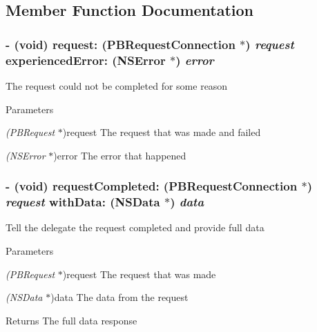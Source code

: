 \subsection{Member Function Documentation}
\hypertarget{protocol_p_b_request_data_delegate-p_ac1ed08e62e6d22f177e90a8ffa2529e7}{
\subsubsection[{request:experiencedError:}]{\setlength{\rightskip}{0pt plus 5cm}-\/ (void) request: ({\bf PBRequestConnection} $\ast$) {\em request}\/ experiencedError: (NSError $\ast$) {\em error}}}
\label{protocol_p_b_request_data_delegate-p_ac1ed08e62e6d22f177e90a8ffa2529e7}
The request could not be completed for some reason 
\begin{DoxyParams}{Parameters}
\item[{\em (PBRequest}]$\ast$)request The request that was made and failed \item[{\em (NSError}]$\ast$)error The error that happened \end{DoxyParams}
\hypertarget{protocol_p_b_request_data_delegate-p_a8c470348d27d13f5d8784b65c8989e95}{
\subsubsection[{requestCompleted:withData:}]{\setlength{\rightskip}{0pt plus 5cm}-\/ (void) requestCompleted: ({\bf PBRequestConnection} $\ast$) {\em request}\/ withData: (NSData $\ast$) {\em data}}}
\label{protocol_p_b_request_data_delegate-p_a8c470348d27d13f5d8784b65c8989e95}
Tell the delegate the request completed and provide full data 
\begin{DoxyParams}{Parameters}
\item[{\em (PBRequest}]$\ast$)request The request that was made \item[{\em (NSData}]$\ast$)data The data from the request \end{DoxyParams}
\begin{DoxyReturn}{Returns}
The full data response 
\end{DoxyReturn}
